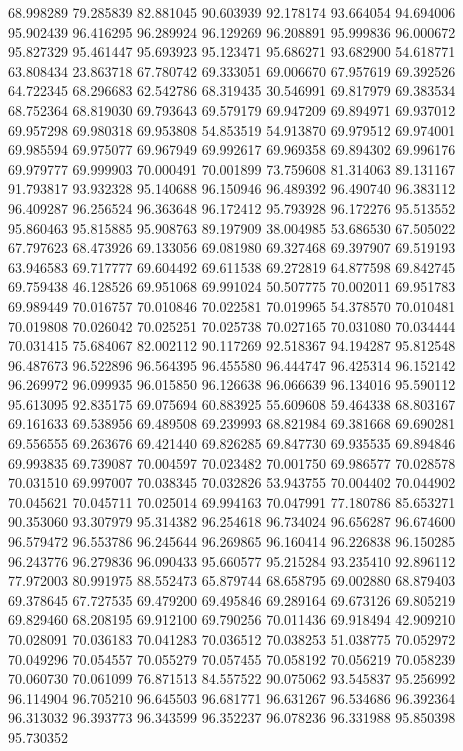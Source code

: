 68.998289
79.285839
82.881045
90.603939
92.178174
93.664054
94.694006
95.902439
96.416295
96.289924
96.129269
96.208891
95.999836
96.000672
95.827329
95.461447
95.693923
95.123471
95.686271
93.682900
54.618771
63.808434
23.863718
67.780742
69.333051
69.006670
67.957619
69.392526
64.722345
68.296683
62.542786
68.319435
30.546991
69.817979
69.383534
68.752364
68.819030
69.793643
69.579179
69.947209
69.894971
69.937012
69.957298
69.980318
69.953808
54.853519
54.913870
69.979512
69.974001
69.985594
69.975077
69.967949
69.992617
69.969358
69.894302
69.996176
69.979777
69.999903
70.000491
70.001899
73.759608
81.314063
89.131167
91.793817
93.932328
95.140688
96.150946
96.489392
96.490740
96.383112
96.409287
96.256524
96.363648
96.172412
95.793928
96.172276
95.513552
95.860463
95.815885
95.908763
89.197909
38.004985
53.686530
67.505022
67.797623
68.473926
69.133056
69.081980
69.327468
69.397907
69.519193
63.946583
69.717777
69.604492
69.611538
69.272819
64.877598
69.842745
69.759438
46.128526
69.951068
69.991024
50.507775
70.002011
69.951783
69.989449
70.016757
70.010846
70.022581
70.019965
54.378570
70.010481
70.019808
70.026042
70.025251
70.025738
70.027165
70.031080
70.034444
70.031415
75.684067
82.002112
90.117269
92.518367
94.194287
95.812548
96.487673
96.522896
96.564395
96.455580
96.444747
96.425314
96.152142
96.269972
96.099935
96.015850
96.126638
96.066639
96.134016
95.590112
95.613095
92.835175
69.075694
60.883925
55.609608
59.464338
68.803167
69.161633
69.538956
69.489508
69.239993
68.821984
69.381668
69.690281
69.556555
69.263676
69.421440
69.826285
69.847730
69.935535
69.894846
69.993835
69.739087
70.004597
70.023482
70.001750
69.986577
70.028578
70.031510
69.997007
70.038345
70.032826
53.943755
70.004402
70.044902
70.045621
70.045711
70.025014
69.994163
70.047991
77.180786
85.653271
90.353060
93.307979
95.314382
96.254618
96.734024
96.656287
96.674600
96.579472
96.553786
96.245644
96.269865
96.160414
96.226838
96.150285
96.243776
96.279836
96.090433
95.660577
95.215284
93.235410
92.896112
77.972003
80.991975
88.552473
65.879744
68.658795
69.002880
68.879403
69.378645
67.727535
69.479200
69.495846
69.289164
69.673126
69.805219
69.829460
68.208195
69.912100
69.790256
70.011436
69.918494
42.909210
70.028091
70.036183
70.041283
70.036512
70.038253
51.038775
70.052972
70.049296
70.054557
70.055279
70.057455
70.058192
70.056219
70.058239
70.060730
70.061099
76.871513
84.557522
90.075062
93.545837
95.256992
96.114904
96.705210
96.645503
96.681771
96.631267
96.534686
96.392364
96.313032
96.393773
96.343599
96.352237
96.078236
96.331988
95.850398
95.730352
